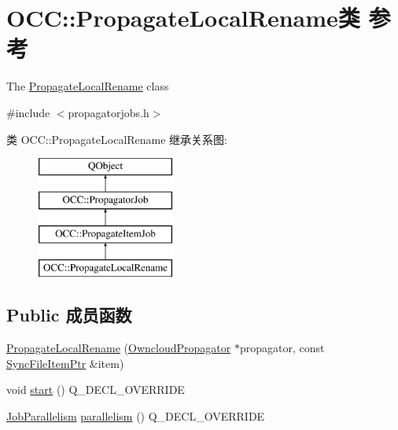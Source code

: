 \hypertarget{class_o_c_c_1_1_propagate_local_rename}{}\section{O\+CC\+:\+:Propagate\+Local\+Rename类 参考}
\label{class_o_c_c_1_1_propagate_local_rename}


The \hyperlink{class_o_c_c_1_1_propagate_local_rename}{Propagate\+Local\+Rename} class  




{\ttfamily \#include $<$propagatorjobs.\+h$>$}

类 O\+CC\+:\+:Propagate\+Local\+Rename 继承关系图\+:\begin{figure}[H]
\begin{center}
\leavevmode
\includegraphics[height=4.000000cm]{class_o_c_c_1_1_propagate_local_rename}
\end{center}
\end{figure}
\subsection*{Public 成员函数}
\begin{DoxyCompactItemize}
\item 
\hyperlink{class_o_c_c_1_1_propagate_local_rename_a51826759dd66859c29467e9af41643f0}{Propagate\+Local\+Rename} (\hyperlink{class_o_c_c_1_1_owncloud_propagator}{Owncloud\+Propagator} $\ast$propagator, const \hyperlink{namespace_o_c_c_acb6b0db82893659fbd0c98d3c5b8e2b8}{Sync\+File\+Item\+Ptr} \&item)
\item 
void \hyperlink{class_o_c_c_1_1_propagate_local_rename_a9c4741f660f381d80ca02fa886b4aec2}{start} () Q\+\_\+\+D\+E\+C\+L\+\_\+\+O\+V\+E\+R\+R\+I\+DE
\item 
\hyperlink{class_o_c_c_1_1_propagator_job_a2527eb0e2b598fc260a2d6449689c156}{Job\+Parallelism} \hyperlink{class_o_c_c_1_1_propagate_local_rename_adfcdea813d4f88fc5f02d9f20f18d477}{parallelism} () Q\+\_\+\+D\+E\+C\+L\+\_\+\+O\+V\+E\+R\+R\+I\+DE
\end{DoxyCompactItemize}
